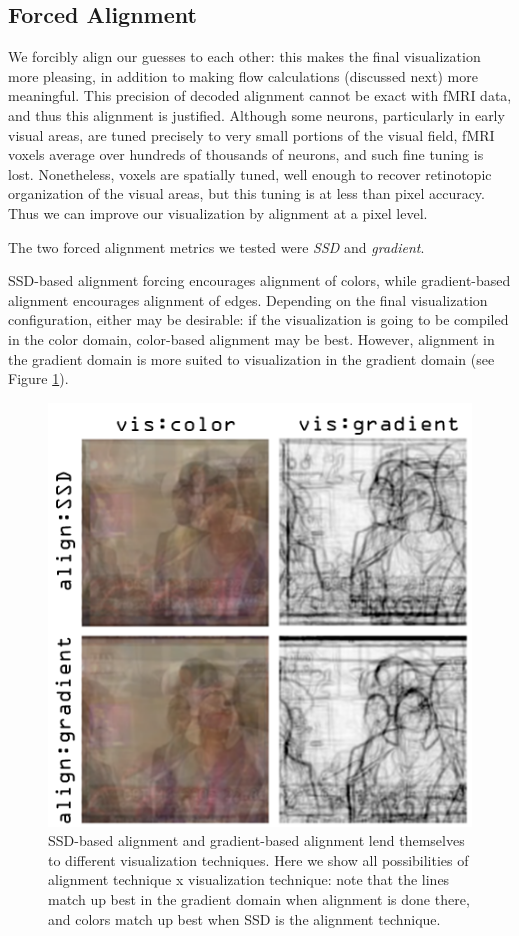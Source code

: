 \subsection{Forced Alignment}
We forcibly align our guesses to each other: this makes the final visualization more pleasing, in addition to making flow calculations (discussed next) more meaningful. This precision of decoded alignment cannot be exact with fMRI data, and thus this alignment is justified. Although some neurons, particularly in early visual areas, are tuned precisely to very small portions of the visual field, fMRI voxels average over hundreds of thousands of neurons, and such fine tuning is lost. Nonetheless, voxels are spatially tuned, well enough to recover retinotopic organization of the visual areas, but this tuning is at less than pixel accuracy. Thus we can improve our visualization by alignment at a pixel level.

The two forced alignment metrics we tested were \emph{SSD} and \emph{gradient}.

SSD-based alignment forcing encourages alignment of colors, while gradient-based alignment encourages alignment of edges.  Depending on the final visualization configuration, either may be desirable: if the visualization is going to be compiled in the color domain, color-based alignment may be best.  However, alignment in the gradient domain is more suited to visualization in the gradient domain (see Figure \ref{fig:align}).

\begin{figure}
\centering
    \includegraphics[width=1.0\columnwidth]{figures/align.png}
\caption{SSD-based alignment and gradient-based alignment lend themselves to different visualization techniques.  Here we show all possibilities of alignment technique x visualization technique: note that the lines match up best in the gradient domain when alignment is done there, and colors match up best when SSD is the alignment technique.}
\label{fig:align}
\end{figure}

